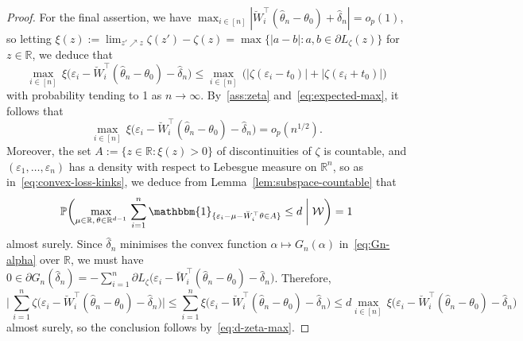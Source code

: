\documentclass[a4paper]{article}
\newcommand{\R}{\mathbb{R}}
\renewcommand{\Pr}{\mathbb{P}}
\newcommand{\Ind}{\mathbbm{1}}
\theoremstyle{definition}
\begin{document}
\begin{proof}
For the final assertion, we have $\max_{i \in [n]} |\breve{W}_i^\top(\hat{\theta}_n - \theta_0) + \hat{\delta}_n| = o_p(1)$, so letting $\xi(z) := \lim_{z' \nearrow z}\zeta(z') - \zeta(z) = \max\{|a - b| : a,b \in \partial L_\zeta(z)\}$ for $z \in \R$, we deduce that
\[
\max_{i \in [n]}\,\xi\bigl(\varepsilon_i - \breve{W}_i^\top(\hat{\theta}_n - \theta_0) - \hat{\delta}_n\bigr) \leq \max_{i \in [n]}\,\bigl(|\zeta(\varepsilon_i - t_0)| + |\zeta(\varepsilon_i + t_0)|\bigr)
\]
with probability tending to 1 as $n \to \infty$. By~\ref{ass:zeta} and~\eqref{eq:expected-max}, it follows that
\begin{equation}
\label{eq:d-zeta-max}
\max_{i \in [n]}\,\xi\bigl(\varepsilon_i - \breve{W}_i^\top(\hat{\theta}_n - \theta_0) - \hat{\delta}_n\bigr) = o_p(n^{1/2}).
\end{equation}
Moreover, the set $A := \{z \in \R : \xi(z) > 0\}$ of discontinuities of $\zeta$ is countable, and $(\varepsilon_1,\dotsc,\varepsilon_n)$ has a density with respect to Lebesgue measure on $\R^n$, so as in~\eqref{eq:convex-loss-kinks}, we deduce from Lemma~\ref{lem:subspace-countable} that
\[
\Pr\biggl(\max_{\mu \in \R,\,\theta \in \R^{d-1}}\,\sum_{i=1}^n \Ind_{\{\varepsilon_i - \mu - \breve{W}_i^\top\theta \in A\}} \leq d \biggm| \mathcal{W}\biggr) = 1
\]
almost surely. Since $\hat{\delta}_n$ minimises the convex function $\alpha \mapsto G_n(\alpha)$ in~\eqref{eq:Gn-alpha} over $\R$, we must have $0 \in \partial G_n(\hat{\delta}_n) = -\sum_{i=1}^n \partial L_\zeta\bigl(\varepsilon_i - \breve{W}_i^\top(\hat{\theta}_n - \theta_0) - \hat{\delta}_n\bigr)$. Therefore,
\[
\Biggl|\,\sum_{i=1}^n \zeta\bigl(\varepsilon_i - \breve{W}_i^\top(\hat{\theta}_n - \theta_0) - \hat{\delta}_n\bigr)\Biggr| \leq \sum_{i=1}^n \xi\bigl(\varepsilon_i - \breve{W}_i^\top(\hat{\theta}_n - \theta_0) - \hat{\delta}_n\bigr) \leq d\max_{i \in [n]}\,\xi\bigl(\varepsilon_i - \breve{W}_i^\top(\hat{\theta}_n - \theta_0) - \hat{\delta}_n\bigr)
\]
almost surely, so the conclusion follows by~\eqref{eq:d-zeta-max}.
\end{proof}
\end{document}
